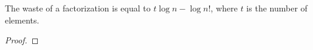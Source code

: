 \begin{lemma}
\label{waste-eq}
\leanok
The waste of a factorization is equal to $t \log n - \log n!$, where $t$ is the
  number of elements.
\end{lemma}
\begin{proof}
\leanok
\end{proof}
